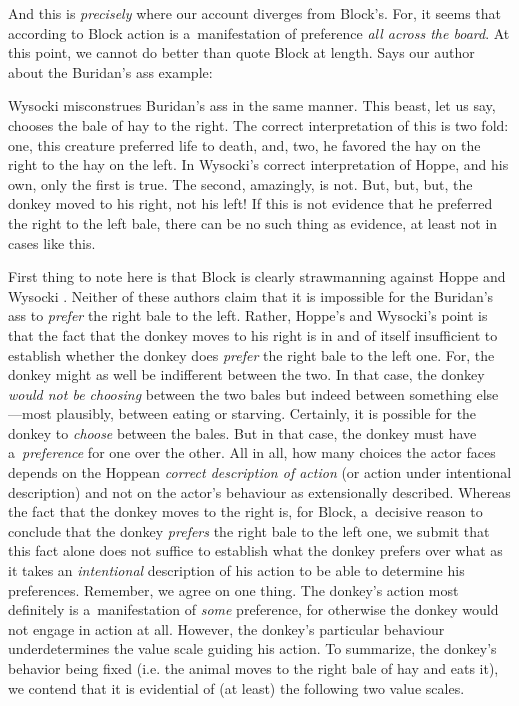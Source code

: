 And this is \textit{precisely} where our account diverges from Block's. For, it seems that according to Block action is a~manifestation of preference \textit{all across the board}. At this point, we cannot do better than quote Block at length. Says our author about the Buridan's ass example:



Wysocki misconstrues Buridan's ass in the same manner. This beast, let us say, chooses the bale of hay to the right. The correct interpretation of this is two fold: one, this creature preferred life to death, and, two, he favored the hay on the right to the hay on the left. In Wysocki's correct interpretation of Hoppe, and his own, only the first is true. The second, amazingly, is not. But, but, but, the donkey moved to his right, not his left! If this is not evidence that he preferred the right to the left bale, there can be no such thing as evidence, at least not in cases like this. 
\parencite[][pp.51–52]{block_response_2022}%




First thing to note here is that Block is clearly strawmanning against Hoppe 
\parencite*[][]{hoppe_must_2005} %
 and Wysocki 
\parencite*[][]{}. %
 Neither of these authors claim that it is impossible for the Buridan's ass to \textit{prefer} the right bale to the left. Rather, Hoppe's and Wysocki's point is that the fact that the donkey moves to his right is in and of itself insufficient to establish whether the donkey does \textit{prefer} the right bale to the left one. For, the donkey might as well be indifferent between the two. In that case, the donkey \textit{would not be choosing} between the two bales but indeed between something else---most plausibly, between eating or starving. Certainly, it is possible for the donkey to \textit{choose} between the bales. But in that case, the donkey must have a~\textit{preference} for one over the other. All in all, how many choices the actor faces depends on the Hoppean 
\parencite*[][]{hoppe_must_2005} %
 \textit{correct description of action} (or action under intentional description) and not on the actor's behaviour as extensionally described. Whereas the fact that the donkey moves to the right is, for Block, a~decisive reason to conclude that the donkey \textit{prefers} the right bale to the left one, we submit that this fact alone does not suffice to establish what the donkey prefers over what as it takes an \textit{intentional} description of his action to be able to determine his preferences. Remember, we agree on one thing. The donkey's action most definitely is a~manifestation of \textit{some} preference, for otherwise the donkey would not engage in action at all. However, the donkey's particular behaviour underdetermines the value scale guiding his action. To summarize, the donkey's behavior being fixed (i.e. the animal moves to the right bale of hay and eats it), we contend that it is evidential of (at least) the following two value scales.



